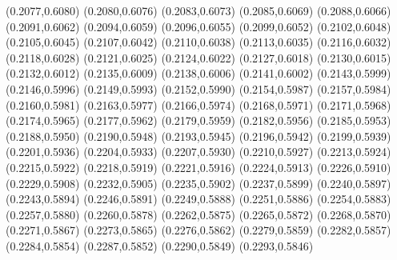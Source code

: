 \PST@Filltriangle(0.2077,0.6080)
\PST@Filltriangle(0.2080,0.6076)
\PST@Filltriangle(0.2083,0.6073)
\PST@Filltriangle(0.2085,0.6069)
\PST@Filltriangle(0.2088,0.6066)
\PST@Filltriangle(0.2091,0.6062)
\PST@Filltriangle(0.2094,0.6059)
\PST@Filltriangle(0.2096,0.6055)
\PST@Filltriangle(0.2099,0.6052)
\PST@Filltriangle(0.2102,0.6048)
\PST@Filltriangle(0.2105,0.6045)
\PST@Filltriangle(0.2107,0.6042)
\PST@Filltriangle(0.2110,0.6038)
\PST@Filltriangle(0.2113,0.6035)
\PST@Filltriangle(0.2116,0.6032)
\PST@Filltriangle(0.2118,0.6028)
\PST@Filltriangle(0.2121,0.6025)
\PST@Filltriangle(0.2124,0.6022)
\PST@Filltriangle(0.2127,0.6018)
\PST@Filltriangle(0.2130,0.6015)
\PST@Filltriangle(0.2132,0.6012)
\PST@Filltriangle(0.2135,0.6009)
\PST@Filltriangle(0.2138,0.6006)
\PST@Filltriangle(0.2141,0.6002)
\PST@Filltriangle(0.2143,0.5999)
\PST@Filltriangle(0.2146,0.5996)
\PST@Filltriangle(0.2149,0.5993)
\PST@Filltriangle(0.2152,0.5990)
\PST@Filltriangle(0.2154,0.5987)
\PST@Filltriangle(0.2157,0.5984)
\PST@Filltriangle(0.2160,0.5981)
\PST@Filltriangle(0.2163,0.5977)
\PST@Filltriangle(0.2166,0.5974)
\PST@Filltriangle(0.2168,0.5971)
\PST@Filltriangle(0.2171,0.5968)
\PST@Filltriangle(0.2174,0.5965)
\PST@Filltriangle(0.2177,0.5962)
\PST@Filltriangle(0.2179,0.5959)
\PST@Filltriangle(0.2182,0.5956)
\PST@Filltriangle(0.2185,0.5953)
\PST@Filltriangle(0.2188,0.5950)
\PST@Filltriangle(0.2190,0.5948)
\PST@Filltriangle(0.2193,0.5945)
\PST@Filltriangle(0.2196,0.5942)
\PST@Filltriangle(0.2199,0.5939)
\PST@Filltriangle(0.2201,0.5936)
\PST@Filltriangle(0.2204,0.5933)
\PST@Filltriangle(0.2207,0.5930)
\PST@Filltriangle(0.2210,0.5927)
\PST@Filltriangle(0.2213,0.5924)
\PST@Filltriangle(0.2215,0.5922)
\PST@Filltriangle(0.2218,0.5919)
\PST@Filltriangle(0.2221,0.5916)
\PST@Filltriangle(0.2224,0.5913)
\PST@Filltriangle(0.2226,0.5910)
\PST@Filltriangle(0.2229,0.5908)
\PST@Filltriangle(0.2232,0.5905)
\PST@Filltriangle(0.2235,0.5902)
\PST@Filltriangle(0.2237,0.5899)
\PST@Filltriangle(0.2240,0.5897)
\PST@Filltriangle(0.2243,0.5894)
\PST@Filltriangle(0.2246,0.5891)
\PST@Filltriangle(0.2249,0.5888)
\PST@Filltriangle(0.2251,0.5886)
\PST@Filltriangle(0.2254,0.5883)
\PST@Filltriangle(0.2257,0.5880)
\PST@Filltriangle(0.2260,0.5878)
\PST@Filltriangle(0.2262,0.5875)
\PST@Filltriangle(0.2265,0.5872)
\PST@Filltriangle(0.2268,0.5870)
\PST@Filltriangle(0.2271,0.5867)
\PST@Filltriangle(0.2273,0.5865)
\PST@Filltriangle(0.2276,0.5862)
\PST@Filltriangle(0.2279,0.5859)
\PST@Filltriangle(0.2282,0.5857)
\PST@Filltriangle(0.2284,0.5854)
\PST@Filltriangle(0.2287,0.5852)
\PST@Filltriangle(0.2290,0.5849)
\PST@Filltriangle(0.2293,0.5846)
